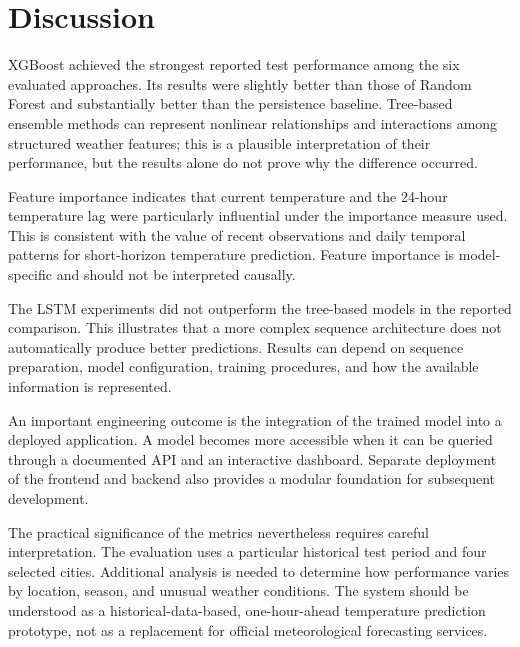 \documentclass[12pt,a4paper]{article}
\begin{document}
	\section{Discussion}
	
	XGBoost achieved the strongest reported test performance among
	the six evaluated approaches. Its results were slightly better
	than those of Random Forest and substantially better than the
	persistence baseline. Tree-based ensemble methods can represent
	nonlinear relationships and interactions among structured weather
	features; this is a plausible interpretation of their performance,
	but the results alone do not prove why the difference occurred.
	
	Feature importance indicates that current temperature and the
	24-hour temperature lag were particularly influential under the
	importance measure used. This is consistent with the value of
	recent observations and daily temporal patterns for short-horizon
	temperature prediction. Feature importance is model-specific and
	should not be interpreted causally.
	
	The LSTM experiments did not outperform the tree-based models in
	the reported comparison. This illustrates that a more complex
	sequence architecture does not automatically produce better
	predictions. Results can depend on sequence preparation, model
	configuration, training procedures, and how the available
	information is represented.
	
	An important engineering outcome is the integration of the trained
	model into a deployed application. A model becomes more accessible
	when it can be queried through a documented API and an interactive
	dashboard. Separate deployment of the frontend and backend also
	provides a modular foundation for subsequent development.
	
	The practical significance of the metrics nevertheless requires
	careful interpretation. The evaluation uses a particular historical
	test period and four selected cities. Additional analysis is needed
	to determine how performance varies by location, season, and
	unusual weather conditions. The system should be understood as a
	historical-data-based, one-hour-ahead temperature prediction
	prototype, not as a replacement for official meteorological
	forecasting services.
	
\end{document}

